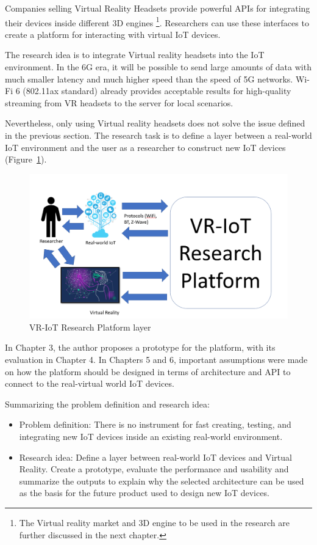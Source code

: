 Companies selling Virtual Reality Headsets provide powerful APIs for integrating their devices inside different 3D engines \footnote{The Virtual reality market and 3D engine to be used in the research are further discussed in the next chapter.}. Researchers can use these interfaces to create a platform for interacting with virtual IoT devices.

The research idea is to integrate Virtual reality headsets into the IoT environment. In the 6G era, it will be possible to send large amounts of data with much smaller latency and much higher speed than the speed of 5G networks. Wi-Fi 6 (802.11ax standard) already provides acceptable results for high-quality streaming from VR headsets to the server for local scenarios.

Nevertheless, only using Virtual reality headsets does not solve the issue defined in the previous section. The research task is to define a layer between a real-world IoT environment and the user as a researcher to construct new IoT devices (Figure~\ref{fig:VR-IoTResearchPlatformLayer-figure}). 

\begin{figure}
  \centering
  \includegraphics[width=0.9\linewidth]{figures/VR-IoTResearchPlatformLayer.png}
  \caption{VR-IoT Research Platform layer}
  \label{fig:VR-IoTResearchPlatformLayer-figure}
\end{figure}

In Chapter 3, the author proposes a prototype for the platform, with its evaluation in Chapter 4. In Chapters 5 and 6, important assumptions were made on how the platform should be designed in terms of architecture and API to connect to the real-virtual world IoT devices.

Summarizing the problem definition and research idea:

\begin{itemize}
    \item Problem definition: There is no instrument for fast creating, testing, and integrating new IoT devices inside an existing real-world environment.  
    \item Research idea: Define a layer between real-world IoT devices and Virtual Reality. Create a prototype, evaluate the performance and usability and summarize the outputs to explain why the selected architecture can be used as the basis for the future product used to design new IoT devices.
\end{itemize}
